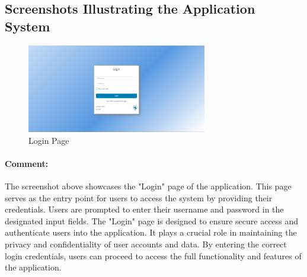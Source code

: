 \subsection{Screenshots Illustrating the Application System}

\bigskip
\begin{figure}[htbp]
    \centering
    \includegraphics[width=0.7\textwidth]{SCREENSHOTS/superadmin/login.PNG}
    \caption{Login Page}
    \label{fig:login}
  \end{figure}
  \paragraph{Comment:} The screenshot above showcases the "Login" page of the application. This page serves as the entry point for users to access the system by providing their credentials. Users are prompted to enter their username and password in the designated input fields. The "Login" page is designed to ensure secure access and authenticate users into the application. It plays a crucial role in maintaining the privacy and confidentiality of user accounts and data. By entering the correct login credentials, users can proceed to access the full functionality and features of the application.

